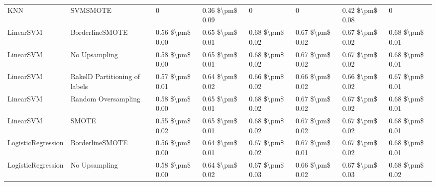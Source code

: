 \begin{tabular}{llllllll}
                            KNN &                      SVMSMOTE &               0 &           0.36 \$\textbackslash pm\$ 0.09 &                     0 &                      0 &                         0.42 \$\textbackslash pm\$ 0.08 &               0 \\
                      LinearSVM &               BorderlineSMOTE & 0.56 \$\textbackslash pm\$ 0.00 &           0.65 \$\textbackslash pm\$ 0.01 &       0.68 \$\textbackslash pm\$ 0.02 &        0.67 \$\textbackslash pm\$ 0.02 &                         0.67 \$\textbackslash pm\$ 0.02 & 0.68 \$\textbackslash pm\$ 0.01 \\
                      LinearSVM &                 No Upsampling & 0.58 \$\textbackslash pm\$ 0.00 &           0.65 \$\textbackslash pm\$ 0.01 &       0.68 \$\textbackslash pm\$ 0.02 &        0.67 \$\textbackslash pm\$ 0.02 &                         0.67 \$\textbackslash pm\$ 0.02 & 0.68 \$\textbackslash pm\$ 0.01 \\
                      LinearSVM & RakelD Partitioning of labels & 0.57 \$\textbackslash pm\$ 0.01 &           0.64 \$\textbackslash pm\$ 0.02 &       0.66 \$\textbackslash pm\$ 0.02 &        0.66 \$\textbackslash pm\$ 0.02 &                         0.66 \$\textbackslash pm\$ 0.02 & 0.67 \$\textbackslash pm\$ 0.01 \\
                      LinearSVM &           Random Oversampling & 0.58 \$\textbackslash pm\$ 0.00 &           0.65 \$\textbackslash pm\$ 0.01 &       0.68 \$\textbackslash pm\$ 0.02 &        0.67 \$\textbackslash pm\$ 0.02 &                         0.67 \$\textbackslash pm\$ 0.02 & 0.68 \$\textbackslash pm\$ 0.01 \\
                      LinearSVM &                         SMOTE & 0.55 \$\textbackslash pm\$ 0.02 &           0.65 \$\textbackslash pm\$ 0.01 &       0.68 \$\textbackslash pm\$ 0.02 &        0.67 \$\textbackslash pm\$ 0.02 &                         0.67 \$\textbackslash pm\$ 0.02 & 0.68 \$\textbackslash pm\$ 0.01 \\
             LogisticRegression &               BorderlineSMOTE & 0.56 \$\textbackslash pm\$ 0.00 &           0.64 \$\textbackslash pm\$ 0.01 &       0.67 \$\textbackslash pm\$ 0.02 &        0.67 \$\textbackslash pm\$ 0.01 &                         0.67 \$\textbackslash pm\$ 0.02 & 0.68 \$\textbackslash pm\$ 0.01 \\
             LogisticRegression &                 No Upsampling & 0.58 \$\textbackslash pm\$ 0.00 &           0.64 \$\textbackslash pm\$ 0.02 &       0.67 \$\textbackslash pm\$ 0.03 &        0.66 \$\textbackslash pm\$ 0.02 &                         0.67 \$\textbackslash pm\$ 0.03 & 0.68 \$\textbackslash pm\$ 0.02 \\

\end{tabular}
